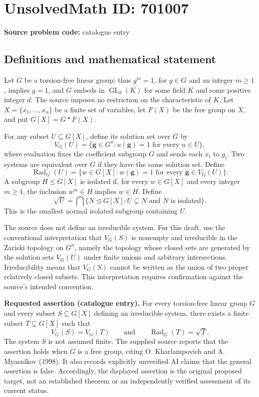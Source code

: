 \documentclass[11pt]{article}
\begin{document}
\section*{UnsolvedMath ID: 701007}
\textbf{Source problem code:} catalogue entry
\subsection{Definitions and mathematical statement}
Let \(G\) be a torsion-free linear group: thus \(g^m=1\), for \(g\in G\) and an integer \(m\geq 1\), implies \(g=1\), and \(G\) embeds in \(\operatorname{GL}_d(K)\) for some field \(K\) and some positive integer \(d\). The source imposes no restriction on the characteristic of \(K\). Let \(X=\{x_1,\ldots,x_n\}\) be a finite set of variables, let \(F(X)\) be the free group on \(X\), and put \(G[X]=G\ast F(X)\).

For any subset \(U\subseteq G[X]\), define its solution set over \(G\) by
\[
V_G(U)=\{\mathbf g\in G^n: u(\mathbf g)=1\text{ for every }u\in U\},
\]
where evaluation fixes the coefficient subgroup \(G\) and sends each \(x_i\) to \(g_i\). Two systems are equivalent over \(G\) if they have the same solution set. Define
\[
\operatorname{Rad}_G(U)=\{w\in G[X]:w(\mathbf g)=1\text{ for every }\mathbf g\in V_G(U)\}.
\]
A subgroup \(H\leq G[X]\) is isolated if, for every \(w\in G[X]\) and every integer \(m\geq1\), the inclusion \(w^m\in H\) implies \(w\in H\). Define
\[
\sqrt{U}=\bigcap\{N\trianglelefteq G[X]: U\subseteq N\text{ and }N\text{ is isolated}\}.
\]
This is the smallest normal isolated subgroup containing \(U\).

The source does not define an irreducible system. For this draft, use the conventional interpretation that \(V_G(S)\) is nonempty and irreducible in the Zariski topology on \(G^n\), namely the topology whose closed sets are generated by the solution sets \(V_G(U)\) under finite unions and arbitrary intersections. Irreducibility means that \(V_G(S)\) cannot be written as the union of two proper relatively closed subsets. This interpretation requires confirmation against the source's intended convention.

\textbf{Requested assertion (catalogue entry).} For every torsion-free linear group \(G\) and every subset \(S\subseteq G[X]\) defining an irreducible system, there exists a finite subset \(T\subseteq G[X]\) such that
\[
V_G(S)=V_G(T)
\qquad\text{and}\qquad
\operatorname{Rad}_G(T)=\sqrt{T}.
\]
The system \(S\) is not assumed finite. The supplied source reports that the assertion holds when \(G\) is a free group, citing O. Kharlampovich and A. Myasnikov (1998). It also records explicitly unverified AI claims that the general assertion is false. Accordingly, the displayed assertion is the original proposed target, not an established theorem or an independently verified assessment of its current status.
\end{document}
